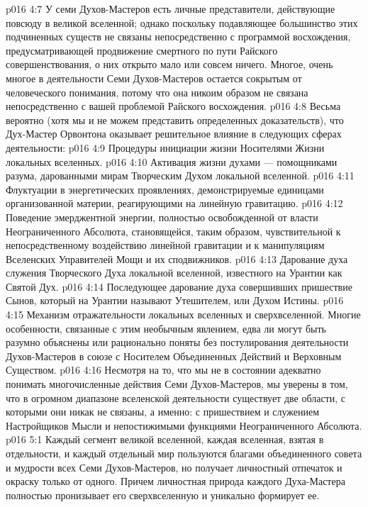 \vs p016 4:7 У семи Духов\hyp{}Мастеров есть личные представители, действующие повсюду в великой вселенной; однако поскольку подавляющее большинство этих подчиненных существ не связаны непосредственно с программой восхождения, предусматривающей продвижение смертного по пути Райского совершенствования, о них открыто мало или совсем ничего. Многое, очень многое в деятельности Семи Духов\hyp{}Мастеров остается сокрытым от человеческого понимания, потому что она никоим образом не связана непосредственно с вашей проблемой Райского восхождения.
\vs p016 4:8 \pc Весьма вероятно (хотя мы и не можем представить определенных доказательств), что Дух\hyp{}Мастер Орвонтона оказывает решительное влияние в следующих сферах деятельности:
\vs p016 4:9 \bibnobreakspace Процедуры инициации жизни Носителями Жизни локальных вселенных.
\vs p016 4:10 \bibnobreakspace Активация жизни духами --- помощниками разума, дарованными мирам Творческим Духом локальной вселенной.
\vs p016 4:11 \bibnobreakspace Флуктуации в энергетических проявлениях, демонстрируемые единицами организованной материи, реагирующими на линейную гравитацию.
\vs p016 4:12 \bibnobreakspace Поведение эмерджентной энергии, полностью освобожденной от власти Неограниченного Абсолюта, становящейся, таким образом, чувствительной к непосредственному воздействию линейной гравитации и к манипуляциям Вселенских Управителей Мощи и их сподвижников.
\vs p016 4:13 \bibnobreakspace Дарование духа служения Творческого Духа локальной вселенной, известного на Урантии как Святой Дух.
\vs p016 4:14 \bibnobreakspace Последующее дарование духа совершивших пришествие Сынов, который на Урантии называют Утешителем, или Духом Истины.
\vs p016 4:15 \bibnobreakspace Механизм отражательности локальных вселенных и сверхвселенной. Многие особенности, связанные с этим необычным явлением, едва ли могут быть разумно объяснены или рационально поняты без постулирования деятельности Духов\hyp{}Мастеров в союзе с Носителем Объединенных Действий и Верховным Существом.
\vs p016 4:16 \pc Несмотря на то, что мы не в состоянии адекватно понимать многочисленные действия Семи Духов\hyp{}Мастеров, мы уверены в том, что в огромном диапазоне вселенской деятельности существует две области, с которыми они никак не связаны, а именно: с пришествием и служением Настройщиков Мысли и непостижимыми функциями Неограниченного Абсолюта.
\vs p016 5:1 Каждый сегмент великой вселенной, каждая вселенная, взятая в отдельности, и каждый отдельный мир пользуются благами объединенного совета и мудрости всех Семи Духов\hyp{}Мастеров, но получает личностный отпечаток и окраску только от одного. Причем личностная природа каждого Духа\hyp{}Мастера полностью пронизывает его сверхвселенную и уникально формирует ее.
